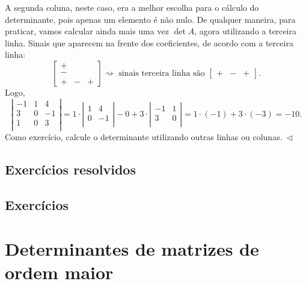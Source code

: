 \begin{ex}
A segunda coluna, neste caso, era a melhor escolha para o cálculo do determinante, pois apenas um elemento é não nulo. De qualquer maneira, para praticar, vamos calcular ainda mais uma vez $\det A$, agora utilizando a terceira linha. Sinais que aparecem na frente dos coeficientes, de acordo com a terceira linha:
\begin{equation}
\begin{bmatrix}
+ & \,\, & \,\, \\
- & \,\, & \,\, \\
+ &  -   &   +
\end{bmatrix}\rightsquigarrow \text{ sinais terceira linha são }
\begin{bmatrix}
+ & - & +
\end{bmatrix}.
\end{equation} Logo,
\begin{equation}
\left|
\begin{matrix}
-1 & 1 & 4 \\
3 & 0 & -1 \\
1 & 0 & 3 \\
\end{matrix}
\right| = 1 \cdot
\left|
\begin{matrix}
 1 & 4 \\
 0 & -1 \\
\end{matrix}
\right| - 0 + 3 \cdot
\left|
\begin{matrix}
-1 & 1 \\
3 & 0  \\
\end{matrix}
\right| = 1 \cdot (-1) + 3 \cdot (-3) = -10.
\end{equation} Como exercício, calcule o determinante utilizando outras linhas ou colunas$. \ \lhd$
\end{ex}

\subsection*{Exercícios resolvidos}

\construirExeresol

\subsection*{Exercícios}

\construirExer


\section{Determinantes de matrizes de ordem maior}

